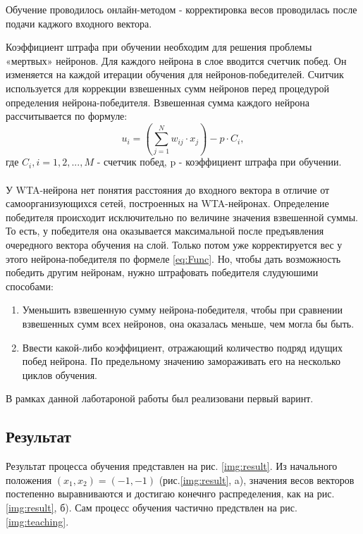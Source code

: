 Обучение проводилось онлайн-методом - корректировка весов проводилась после подачи каджого входного вектора.

Коэффициент штрафа при обучении необходим для решения проблемы «мертвых» нейронов. Для каждого нейрона в слое вводится счетчик побед. Он изменяется на каждой итерации обучения для нейронов-победителей. Считчик используется для коррекции взвешенных сумм нейронов перед процедурой определения нейрона-победителя. Взвешенная сумма каждого нейрона рассчитывается по формуле:
\begin{equation}\label{eq:penaltyFunc}
    u _ { i } = \left( \sum _ { j = 1 } ^ { N } w _ { i j } \cdot x _ { j } \right) - p \cdot C_i,
\end{equation}
где $C_i, i=1, 2, ..., M$ - счетчик побед, p - коэффициент штрафа при обучении.\\
~\\
  У WTA-нейрона нет понятия расстояния до входного вектора в отличие от самоорганизующихся сетей, построенных на WTA-нейронах. Определение победителя происходит исключительно по величине значения взвешенной суммы. То есть, у победителя она оказывается максимальной после предъявления очередного вектора обучения на слой. Только потом уже корректируется вес у этого нейрона-победителя по формеле \eqref{eq:Func}. Но, чтобы дать возможность победить другим нейронам, нужно штрафовать победителя слудуюшими способами:

\begin{enumerate} 
  \item Уменьшить взвешенную сумму нейрона-победителя, чтобы при сравнении  взвешенных сумм всех нейронов, она оказалась меньше, чем могла бы быть.
  \item Ввести какой-либо коэффициент, отражающий количество подряд идущих побед нейрона. По предельному значению замораживать его на несколько циклов обучения.
\end{enumerate}
В рамках данной лаботароной работы был реализовани первый варинт.

\subsection{Результат}

Результат процесса обучения представлен на рис. \ref{img:result}. Из начального положения $(x_1, x_2) = (-1, -1)$ (рис.\ref{img:result}, a), значения весов векторов постепенно выравниваются и достигаю конечнго распределения, как на рис.\ref{img:result}, б). Сам процесс обучения частично предствлен на рис. \ref{img:teaching}.

